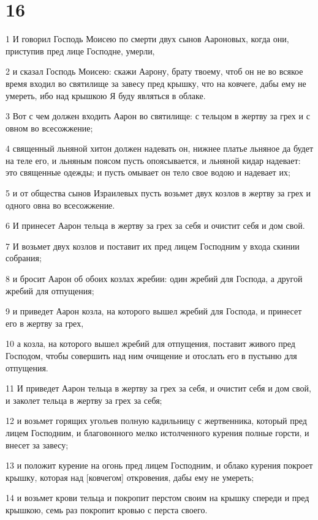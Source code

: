 \chapter{16}

\par 1 И говорил Господь Моисею по смерти двух сынов Аароновых, когда они, приступив пред лице Господне, умерли,
\par 2 и сказал Господь Моисею: скажи Аарону, брату твоему, чтоб он не во всякое время входил во святилище за завесу пред крышку, что на ковчеге, дабы ему не умереть, ибо над крышкою Я буду являться в облаке.
\par 3 Вот с чем должен входить Аарон во святилище: с тельцом в жертву за грех и с овном во всесожжение;
\par 4 священный льняной хитон должен надевать он, нижнее платье льняное да будет на теле его, и льняным поясом пусть опоясывается, и льняной кидар надевает: это священные одежды; и пусть омывает он тело свое водою и надевает их;
\par 5 и от общества сынов Израилевых пусть возьмет двух козлов в жертву за грех и одного овна во всесожжение.
\par 6 И принесет Аарон тельца в жертву за грех за себя и очистит себя и дом свой.
\par 7 И возьмет двух козлов и поставит их пред лицем Господним у входа скинии собрания;
\par 8 и бросит Аарон об обоих козлах жребии: один жребий для Господа, а другой жребий для отпущения;
\par 9 и приведет Аарон козла, на которого вышел жребий для Господа, и принесет его в жертву за грех,
\par 10 а козла, на которого вышел жребий для отпущения, поставит живого пред Господом, чтобы совершить над ним очищение и отослать его в пустыню для отпущения.
\par 11 И приведет Аарон тельца в жертву за грех за себя, и очистит себя и дом свой, и заколет тельца в жертву за грех за себя;
\par 12 и возьмет горящих угольев полную кадильницу с жертвенника, который пред лицем Господним, и благовонного мелко истолченного курения полные горсти, и внесет за завесу;
\par 13 и положит курение на огонь пред лицем Господним, и облако курения покроет крышку, которая над [ковчегом] откровения, дабы ему не умереть;
\par 14 и возьмет крови тельца и покропит перстом своим на крышку спереди и пред крышкою, семь раз покропит кровью с перста своего.
